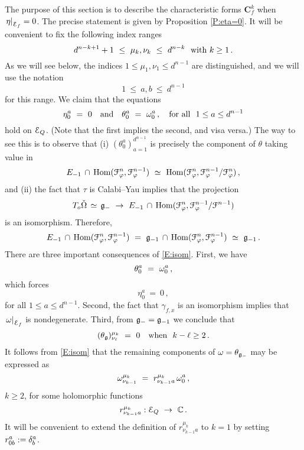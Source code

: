 \documentclass[12pt]{amsart}
\numberwithin{equation}{section}
\numberwithin{table}{section}
\numberwithin{figure}{section}
\begin{document}
The purpose of this section is to describe the characteristic forms $\mathbf{C}^k_f$ when $\left.\eta\right|_{\mathcal E_f} = 0$.  The precise statement is given by Proposition \ref{P:eta=0}.  It will be convenient to fix the following index ranges
\[
  d^{n-k+1}+1 \ \le \ \mu_k,\nu_k \ \le \ d^{n-k} \ \hbox{ with } k \ge 1 \,.
\]
As we will see below, the indices $1 \le \mu_1 , \nu_1 \le d^{n-1}$ are distinguished, and we will use the notation
\[
  1 \ \le \ a,b \ \le \ d^{n-1}
\]
for this range.  We claim that the equations
\begin{equation}\label{E:a0}
  \eta^a_0 \ = \ 0 \tand \theta^a_0 \ = \ \w^a_0 \,, \quad\hbox{for all } \ 
  1 \le a \le d^{n-1} 
\end{equation}
hold on $\mathcal E_Q$.  (Note that the first implies the second, and visa versa.)  The way to see this is to observe that (i) $(\theta^a_0)_{a=1}^{d^{n-1}}$ is precisely the component of $\theta$ taking value in 
\[
  E_{-1} \,\cap\, \tHom(\cF^n_\varphi,\cF^{n-1}_\varphi) \ \simeq \ 
  \tHom(\cF^n_\varphi,\cF^{n-1}_\varphi/\cF^n_\varphi) \,,
\]
and (ii) the fact that $\tau$ is Calabi--Yau implies that the projection
\[
   T_o\check\Omega \,\simeq \, \fg_- \ \to \ 
  E_{-1} \,\cap\, \tHom(\cF^n_\varphi,\cF^{n-1}_\varphi/\cF^{n-1})
\]
is an isomorphism.  Therefore, 
\begin{equation}\label{E:isom}
  E_{-1} \,\cap\, \tHom(\cF^n_\varphi,\cF^{n-1}_\varphi) \ = \ 
  \fg_{-1} \,\cap\, \tHom(\cF^n_\varphi,\cF^{n-1}_\varphi) 
  \ \simeq \ \fg_{-1}\,.
\end{equation}
There are three important consequences of \eqref{E:isom}.  First, we have   
\[
  \theta^a_0 \ = \ \omega^a_0 \,,
\]
which forces 
\[
  \eta^a_0 \ = \ 0 \,,
\]
for all $1 \le a \le d^{n-1}$.  Second, the fact that $\gamma_{f,x}$ is an isomorphism implies that $\left.\omega\right|_{\mathcal E_f}$ is nondegenerate.  Third, from ${\mathfrak{g}}_- = {\mathfrak{g}}_{-1}$ we conclude that
\[
  (\theta_{\mathfrak{g}})^{\mu_k}_{\nu_\ell} \ = \ 0 \quad\hbox{when } \ k-\ell \ge 2 \,.
\]
It follows from \eqref{E:isom} that the remaining components of $\omega=\theta_{{\mathfrak{g}}_-}$ may be expressed as 
\begin{equation}\label{E:r}
  \omega^{\mu_k}_{\nu_{k-1}} \ = \ r^{\mu_k}_{\nu_{k-1}a}\,\omega^a_0 \,,
\end{equation}
$k \ge 2$, for some holomorphic functions
\[
  r^{\mu_k}_{\nu_{k-1}a} : \mathcal E_Q \ \to \ \mathbb C \,.
\]
It will be convenient to extend the definition of $r^{\mu_k}_{\nu_{k-1}a}$ to $k=1$ by setting $r^a_{0b} := \delta^a_b$.
\end{document}
